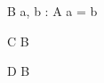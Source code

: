 \begin{zed}
	[A]
\end{zed}

\begin{schema}{B}
	a, b : A
\where
	a = b
\end{schema}

\begin{schema}{C}
	\Delta B
\end{schema}

\begin{schema}{D}
	\Xi B
\end{schema}